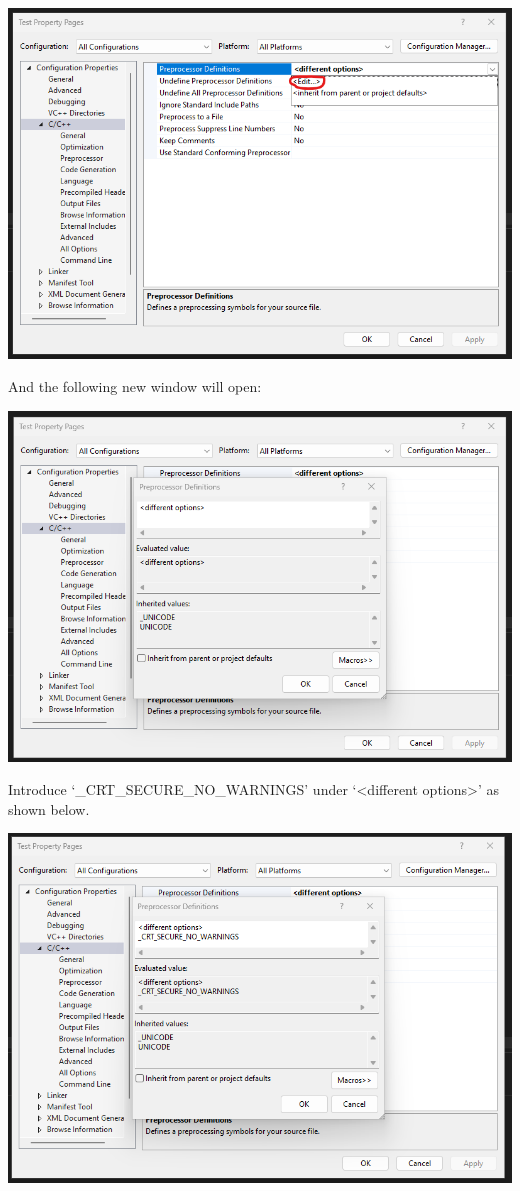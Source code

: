 \documentclass[../en-fa-lab.tex]{subfiles}
\begin{document}
\includegraphics[width=\textwidth,alt={A screenshot of a computer Description automatically generated}]{./Resources/tutorial_lab9/image12.png}

And the following new window will open:

\includegraphics[width=\textwidth,alt={A screenshot of a computer Description automatically generated}]{./Resources/tutorial_lab9/image13.png}

Introduce `\_CRT\_SECURE\_NO\_WARNINGS' under `\textless different
options\textgreater' as shown below.

\includegraphics[width=\textwidth,alt={A screenshot of a computer Description automatically generated}]{./Resources/tutorial_lab9/image14.png}
\end{document}
